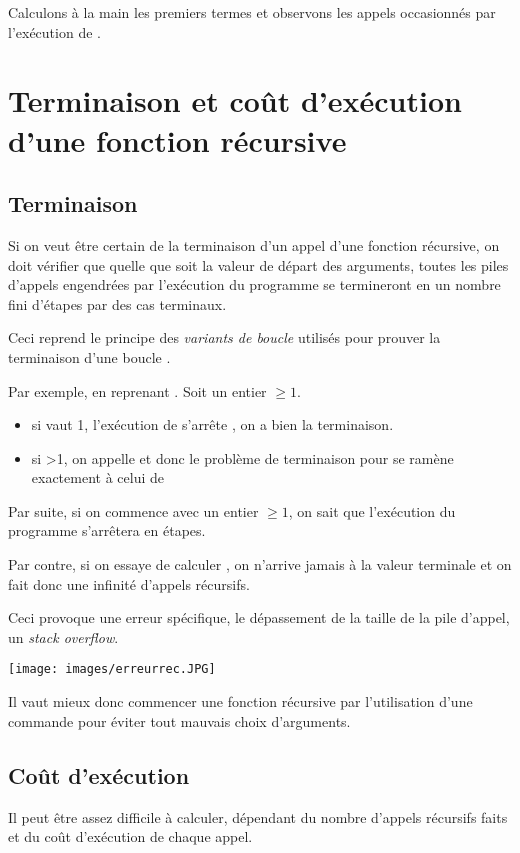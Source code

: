 \documentclass[11pt,a4paper,french,twoside]{PMCours}
\begin{document}
Calculons à la main les premiers termes et observons les appels occasionnés
par l'exécution de .
\vspace{7cm}

\section{Terminaison et coût d'exécution d'une fonction récursive}
\subsection{Terminaison} 
Si on veut être certain de la terminaison d'un appel d'une fonction récursive,
on doit vérifier que quelle que soit la valeur de départ des arguments, 
toutes les piles d'appels engendrées par l'exécution du programme se termineront
en un nombre fini d'étapes par des cas terminaux.

Ceci reprend le principe des {\em variants de boucle} utilisés pour prouver 
la terminaison d'une boucle .

Par exemple, en reprenant . Soit  un entier $\geq1$.
\begin{itemize}
\item si  vaut 1, l'exécution de  s'arrête , 
on a bien la terminaison.
\item si >1, on appelle  et donc le problème 
de terminaison pour  se ramène exactement à celui 
de  
\end{itemize}
Par suite, si on commence avec un entier $\geq1$,
on sait que l'exécution du programme s'arrêtera en   étapes.

Par contre, si on essaye de calculer , on n'arrive 
jamais à la valeur terminale et on fait donc une infinité d'appels récursifs. 

Ceci provoque une erreur spécifique, le dépassement de la taille de la pile 
d'appel, un \emph{stack overflow}.
 
\texttt{[image: images/erreurrec.JPG]}    

Il vaut mieux donc commencer une fonction récursive par l'utilisation d'une commande
 pour éviter tout mauvais choix d'arguments.

\subsection{Coût d'exécution} 
Il peut être assez difficile à calculer, dépendant du nombre d'appels récursifs
faits et du coût d'exécution de chaque appel. 
\end{document}
